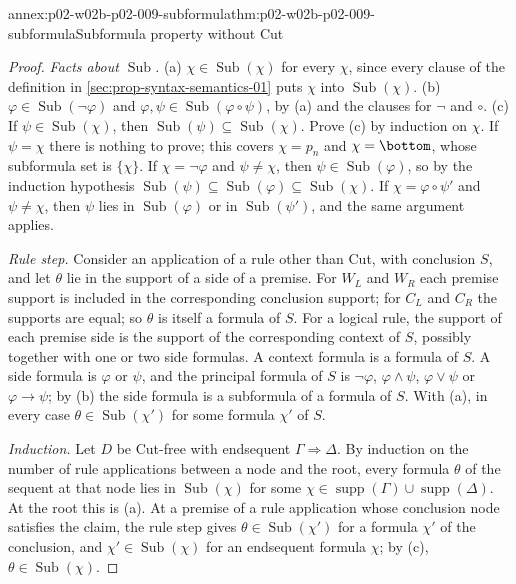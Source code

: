 \begin{annexitem}{annex:p02-w02b-p02-009-subformula}{thm:p02-w02b-p02-009-subformula}{Subformula property without Cut}
\begin{proof}
\emph{Facts about \(\operatorname{Sub}\).}  (a) \(\chi\in\operatorname{Sub}(\chi)\)
for every \(\chi\), since every clause of the definition in
\cref{sec:prop-syntax-semantics-01} puts \(\chi\) into
\(\operatorname{Sub}(\chi)\).  (b) \(\varphi\in\operatorname{Sub}(\neg\varphi)\)
and \(\varphi,\psi\in\operatorname{Sub}(\varphi\circ\psi)\), by (a) and the
clauses for \(\neg\) and \(\circ\).  (c) If \(\psi\in\operatorname{Sub}(\chi)\),
then \(\operatorname{Sub}(\psi)\subseteq\operatorname{Sub}(\chi)\).  Prove (c)
by induction on \(\chi\).  If \(\psi=\chi\) there is nothing to prove; this
covers \(\chi=p_n\) and \(\chi=\bottom\), whose subformula set is
\(\{\chi\}\).  If \(\chi=\neg\varphi\) and \(\psi\neq\chi\), then
\(\psi\in\operatorname{Sub}(\varphi)\), so by the induction hypothesis
\(\operatorname{Sub}(\psi)\subseteq\operatorname{Sub}(\varphi)
\subseteq\operatorname{Sub}(\chi)\).  If \(\chi=\varphi\circ\psi'\) and
\(\psi\neq\chi\), then \(\psi\) lies in \(\operatorname{Sub}(\varphi)\) or in
\(\operatorname{Sub}(\psi')\), and the same argument applies.

\emph{Rule step.}  Consider an application of a rule other than Cut, with
conclusion \(S\), and let \(\theta\) lie in the support of a side of a
premise.  For \(W_L\) and \(W_R\) each premise support is included in the
corresponding conclusion support; for \(C_L\) and \(C_R\) the supports are
equal; so \(\theta\) is itself a formula of \(S\).  For a logical rule, the
support of each premise side is the support of the corresponding context of
\(S\), possibly together with one or two side formulas.  A context formula is
a formula of \(S\).  A side formula is \(\varphi\) or \(\psi\), and the
principal formula of \(S\) is \(\neg\varphi\), \(\varphi\land\psi\),
\(\varphi\lor\psi\) or \(\varphi\to\psi\); by (b) the side formula is a
subformula of a formula of \(S\).  With (a), in every case \(\theta\in
\operatorname{Sub}(\chi')\) for some formula \(\chi'\) of \(S\).

\emph{Induction.}  Let \(D\) be Cut-free with endsequent
\(\Gamma\Rightarrow\Delta\).  By induction on the number of rule applications
between a node and the root, every formula \(\theta\) of the sequent at that
node lies in \(\operatorname{Sub}(\chi)\) for some
\(\chi\in\operatorname{supp}(\Gamma)\cup\operatorname{supp}(\Delta)\).  At
the root this is (a).  At a premise of a rule application whose conclusion
node satisfies the claim, the rule step gives \(\theta\in
\operatorname{Sub}(\chi')\) for a formula \(\chi'\) of the conclusion, and
\(\chi'\in\operatorname{Sub}(\chi)\) for an endsequent formula \(\chi\); by
(c), \(\theta\in\operatorname{Sub}(\chi)\).
\end{proof}
\end{annexitem}

